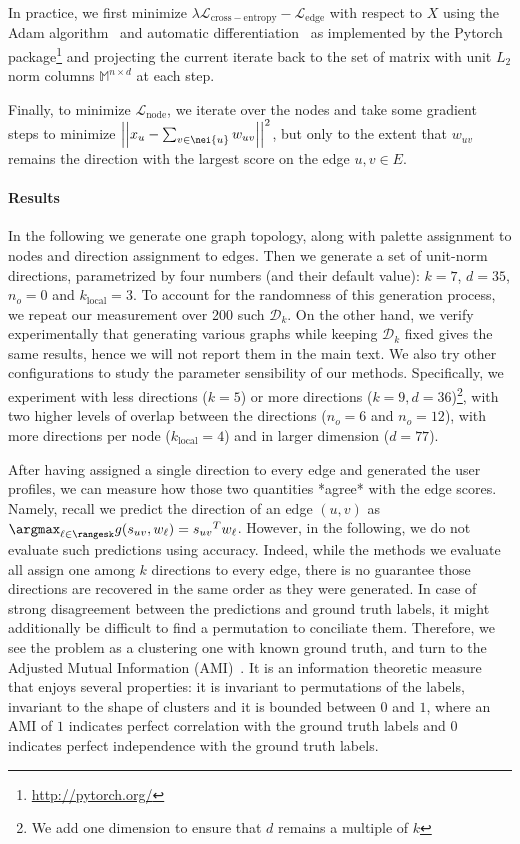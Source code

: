 In practice, we first minimize $\lambda \mathcal{L}_{\mathrm{cross-entropy}} -
\mathcal{L}_{\mathrm{edge}}$ with respect to $X$ using the Adam algorithm~\autocite{Adam15} and
automatic differentiation~\autocite{autograd15} as implemented by the Pytorch
package\footnote{\url{http://pytorch.org/}} and projecting the current iterate back to the set of
matrix with unit $L_2$ norm columns $\mathbb{M}^{n\times d}$ at each step.

Finally, to minimize $\mathcal{L}_{\mathrm{node}}$, we iterate over the nodes and take some gradient
steps to minimize $\left|\left| x_u - \sum_{v\in\nei{u}} w_{uv}\right|\right|^2$, but only to the
extent that $w_{uv}$ remains the direction with the largest score on the edge $u,v \in E$.

\paragraph{Results}
\label{par:edge_synth_results}

In the following we generate one graph topology, along with palette assignment to nodes and
direction assignment to edges. Then we generate a set of unit-norm directions,
parametrized by four numbers (and their default value): $k=7$, $d=35$, $n_o=0$ and
$k_{\mathrm{local}}=3$. To account for the randomness of this generation process, we repeat our
measurement over 200 such $\mathcal{D}_k$. On the other hand, we verify experimentally that
generating various graphs while keeping $\mathcal{D}_k$ fixed gives the same results, hence we will
not report them in the main text.
We also try other configurations to study the parameter sensibility of our methods. Specifically, we
experiment with less directions ($k=5$) or more directions ($k=9, d=36$)\footnote{We add one
dimension to ensure that $d$ remains a multiple of $k$}, with two higher levels of overlap between
the directions ($n_o=6$ and $n_o=12$), with more directions per node ($k_{\mathrm{local}}=4$) and in
larger dimension ($d=77$).

After having assigned a single direction to every edge and generated the user profiles, we can
measure how those two quantities *agree* with the edge scores. Namely, recall we predict the
direction of an edge $(u,v)$ as $\argmax_{\ell \in \rangesk} g(s_{uv}, w_\ell) = {s_{uv}}^T w_\ell$.
However, in the following, we do not evaluate such predictions using accuracy. Indeed, while the
methods we evaluate all assign one among $k$ directions to every edge, there is no guarantee those
directions are recovered in the same order as they were generated. In case of strong disagreement
between the predictions and ground truth labels, it might additionally be difficult to find a
permutation to conciliate them.  Therefore, we see the problem as a clustering one with known ground
truth, and turn to the Adjusted Mutual Information (AMI)~\autocite{AMI09}. It is an information
theoretic measure that enjoys several properties: it is invariant to permutations of the labels,
invariant to the shape of clusters and it is bounded between $0$ and $1$, where an AMI of $1$
indicates perfect correlation with the ground truth labels and $0$ indicates perfect independence
with the ground truth labels.

